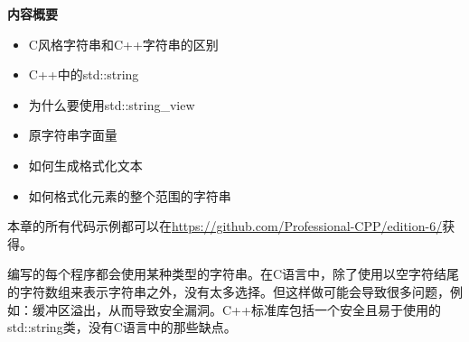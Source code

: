 \noindent
\textbf{内容概要}

\begin{itemize}
\item
C风格字符串和C++字符串的区别

\item
C++中的std::string

\item
为什么要使用std::string\_view

\item
原字符串字面量

\item
如何生成格式化文本

\item
如何格式化元素的整个范围的字符串
\end{itemize}


本章的所有代码示例都可以在\url{https://github.com/Professional-CPP/edition-6/}获得。

编写的每个程序都会使用某种类型的字符串。在C语言中，除了使用以空字符结尾的字符数组来表示字符串之外，没有太多选择。但这样做可能会导致很多问题，例如：缓冲区溢出，从而导致安全漏洞。C++标准库包括一个安全且易于使用的std::string类，没有C语言中的那些缺点。














